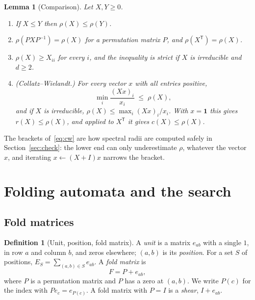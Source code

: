\documentclass[11pt]{amsart}
\theoremstyle{plain}
\newtheorem{Lemma}[Theorem]{Lemma}
\theoremstyle{definition}
\newtheorem{Definition}[Theorem]{Definition}
\begin{document}
\begin{Lemma}[Comparison]
  \label{lem:facts}
  Let $X,Y\ge0$.
  \begin{enumerate}
  \item If $X\le Y$ then $\rho(X)\le\rho(Y)$.
  \item $\rho(PXP^{-1})=\rho(X)$ for a permutation matrix $P$, and
    $\rho(X^{\mathsf T})=\rho(X)$.
  \item $\rho(X)\ge X_{ii}$ for every $i$, and the inequality is strict if
    $X$ is irreducible and $d\ge2$.
  \item \emph{(Collatz--Wielandt.)}  For every vector $x$ with all entries
    positive,
    \begin{equation}
      \label{eq:cw}
      \min_i\frac{(Xx)_i}{x_i}\;\le\;\rho(X),
    \end{equation}
    and if $X$ is irreducible, $\rho(X)\le\max_i(Xx)_i/x_i$.  With
    $x=\mathbf 1$ this gives $r(X)\le\rho(X)$, and applied to
    $X^{\mathsf T}$ it gives $c(X)\le\rho(X)$.
  \end{enumerate}
\end{Lemma}

The brackets of~\eqref{eq:cw} are how spectral radii are computed safely
in Section~\ref{sec:check}: the lower end can only underestimate $\rho$,
whatever the vector $x$, and iterating $x\leftarrow(X+I)x$ narrows the
bracket.

\section{Folding automata and the search}
\label{sec:automaton}

\subsection{Fold matrices}

\begin{Definition}[Unit, position, fold matrix]
  \label{def:fold}
  A \emph{unit} is a matrix $e_{ab}$ with a single $1$, in row $a$ and
  column $b$, and zeros elsewhere; $(a,b)$ is its \emph{position}.  For a
  set $S$ of positions, $E_S=\sum_{(a,b)\in S}e_{ab}$.  A \emph{fold
  matrix} is
  \begin{equation}
    \label{eq:fold}
    F=P+e_{ab},
  \end{equation}
  where $P$ is a permutation matrix and $P$ has a zero at $(a,b)$.  We write
  $P(c)$ for the index with $Pe_c=e_{P(c)}$.  A fold matrix with $P=I$ is
  a \emph{shear}, $I+e_{ab}$.
\end{Definition}
\end{document}
